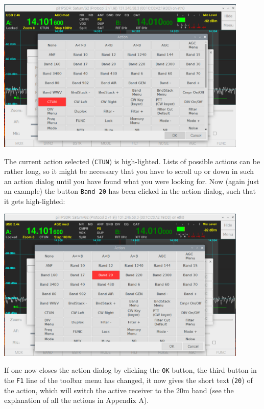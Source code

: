\documentclass[12pt]{book}
\begin{document}
\begin{center}
\includegraphics[width=12cm]{ToolbarMenu2.png}
\end{center}

The current action selected (\texttt{CTUN}) is high-lighted. Lists of possible actions can be rather long,
so it might be necessary that you have to scroll up or down in such an action dialog until you have
found what you were looking for. Now (again just an example) the button \texttt{Band 20} has been clicked
in the action dialog, such that it gets high-lighted:

\begin{center}
\includegraphics[width=12cm]{ToolbarMenu3.png}
\end{center}

If one now closes the action dialog by clicking the \texttt{OK} button, the third button in the \texttt{F1}
line of the toolbar menu has changed, it now gives the short text (\texttt{20}) of the action, which will
switch the active receiver to the 20m band (see the explanation of all the actions in Appendix A).
\end{document}
